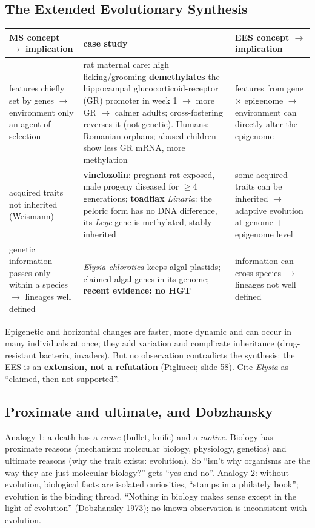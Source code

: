 \subsection{The Extended Evolutionary Synthesis}
\begin{center}\small
\begin{tabularx}{\textwidth}{XXX}
\toprule
MS concept $\to$ implication & case study & EES concept $\to$ implication\\\midrule
features chiefly set by genes $\to$ environment only an agent of selection & rat maternal care: high licking/grooming
\textbf{demethylates} the hippocampal glucocorticoid-receptor (GR) promoter in week 1 $\to$ more GR $\to$ calmer adults;
cross-fostering reverses it (not genetic). Humans: Romanian orphans; abused children show less GR mRNA, more methylation &
features from gene $\times$ epigenome $\to$ environment can directly alter the epigenome\\
acquired traits not inherited (Weismann) & \textbf{vinclozolin}: pregnant rat exposed, male progeny diseased for
$\ge$4 generations; \textbf{toadflax} \emph{Linaria}: the peloric form has no DNA difference, its \emph{Lcyc} gene is
methylated, stably inherited & some acquired traits can be inherited $\to$ adaptive evolution at genome + epigenome level\\
genetic information passes only within a species $\to$ lineages well defined & \emph{Elysia chlorotica} keeps algal plastids;
claimed algal genes in its genome; \textbf{recent evidence: no HGT} & information can cross species $\to$ lineages not
well defined\\\bottomrule
\end{tabularx}
\end{center}
Epigenetic and horizontal changes are faster, more dynamic and can occur in many individuals at once; they add
variation and complicate inheritance (drug-resistant bacteria, invaders). But no observation contradicts the
synthesis: the EES is an \textbf{extension, not a refutation} (Pigliucci; slide 58). Cite \emph{Elysia} as ``claimed,
then not supported''.

\subsection{Proximate and ultimate, and Dobzhansky}
Analogy 1: a death has a \emph{cause} (bullet, knife) and a \emph{motive}. Biology has proximate reasons (mechanism:
molecular biology, physiology, genetics) and ultimate reasons (why the trait exists: evolution). So ``isn't why
organisms are the way they are just molecular biology?'' gets ``yes and no''. Analogy 2: without evolution, biological
facts are isolated curiosities, ``stamps in a philately book''; evolution is the binding thread. ``Nothing in biology
makes sense except in the light of evolution'' (Dobzhansky 1973); no known observation is inconsistent with evolution.

